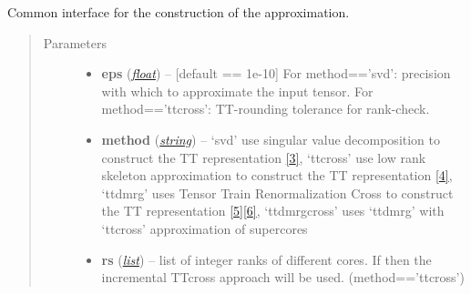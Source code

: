 \documentclass[a4paper,10pt,english]{sphinxmanual}
\begin{document}
\begin{fulllineitems}
\begin{quote}
\begin{description}
\begin{itemize}
\end{itemize}

\end{description}\end{quote}

\begin{fulllineitems}
\label{api-ttvec:TensorToolbox.TTvec.__getitem__}
\end{fulllineitems}


\begin{fulllineitems}
\label{api-ttvec:TensorToolbox.core.TTvec.build}
Common interface for the construction of the approximation.
\begin{quote}\begin{description}
\item[{Parameters}] \leavevmode\begin{itemize}
\item {} 
\textbf{eps} (\href{http://docs.python.org/library/functions.html\#float}{\emph{float}}) -- {[}default == 1e-10{]} For method=='svd': precision with which to approximate the input tensor. For method=='ttcross': TT-rounding tolerance for rank-check.

\item {} 
\textbf{method} (\href{http://docs.python.org/library/string.html\#module-string}{\emph{string}}) -- `svd' use singular value decomposition to construct the TT representation {\hyperref[zrefs:oseledets2011]{{[}3{]}}}, `ttcross' use low rank skeleton approximation to construct the TT representation {\hyperref[zrefs:oseledets2010]{{[}4{]}}}, `ttdmrg' uses Tensor Train Renormalization Cross to construct the TT representation {\hyperref[zrefs:savostyanov2011]{{[}5{]}}}{\hyperref[zrefs:savostyanov2013]{{[}6{]}}}, `ttdmrgcross' uses `ttdmrg' with `ttcross' approximation of supercores

\item {} 
\textbf{rs} (\href{http://docs.python.org/library/functions.html\#list}{\emph{list}}) -- list of integer ranks of different cores. If  then the incremental TTcross approach will be used. (method=='ttcross')


\end{itemize}
\end{description}
\end{quote}
\end{fulllineitems}
\end{fulllineitems}
\end{document}
